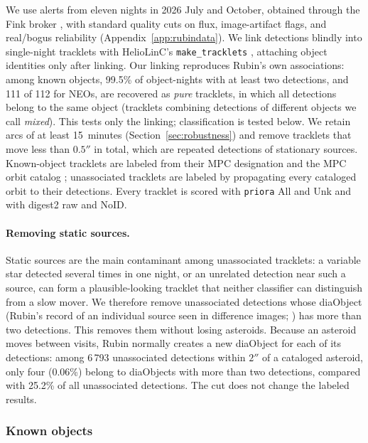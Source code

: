 \documentclass[linenumbers,twocolumn]{aastex701}
\newcommand{\priora}{{\tt priora}\xspace} %
\begin{document}
We use alerts from eleven nights in 2026 July and October, obtained through
the Fink broker \citep{moller2021}, with standard quality cuts on flux,
image-artifact flags, and real/bogus reliability
(Appendix~\ref{app:rubindata}). We link detections blindly into
single-night tracklets with HelioLinC's \texttt{make\_tracklets}
\citep{heinze2022AAS}, attaching object identities only after linking. Our linking reproduces Rubin's own associations: among known objects, 99.5\%
of object-nights with at least two detections, and 111 of 112 for NEOs, are
recovered as \emph{pure} tracklets, in which all detections belong to the
same object (tracklets combining detections of different objects we call
\emph{mixed}). This tests only the linking; classification is tested below.
We retain arcs of at least 15~minutes
(Section~\ref{sec:robustness}) and remove tracklets that move less than
$0.5''$ in total, which are repeated detections of stationary sources.
Known-object tracklets are labeled from their MPC designation and the MPC
orbit catalog \citep{mpcorb}; unassociated tracklets are labeled by
propagating every cataloged orbit to their detections. Every tracklet is
scored with \priora All and Unk and with digest2 raw and NoID.

\paragraph{Removing static sources.}
\label{sec:lsstcut}
Static sources are the main contaminant among unassociated tracklets: a
variable star detected several times in one night, or an unrelated detection
near such a source, can form a plausible-looking tracklet that neither
classifier can distinguish from a slow mover. We therefore remove
unassociated detections whose diaObject (Rubin's record of an individual
source seen in difference images; \citealt{LSE-163}) has more than two
detections. This removes them without losing asteroids. Because an asteroid moves between visits, Rubin normally creates a new
diaObject for each of its detections: among 6\,793 unassociated detections
within $2''$ of a cataloged asteroid, only four (0.06\%) belong to
diaObjects with more than two detections, compared with 25.2\% of all
unassociated detections. The cut does not change the labeled results.

\subsubsection{Known objects}
\label{sec:lsstknown}
\end{document}
